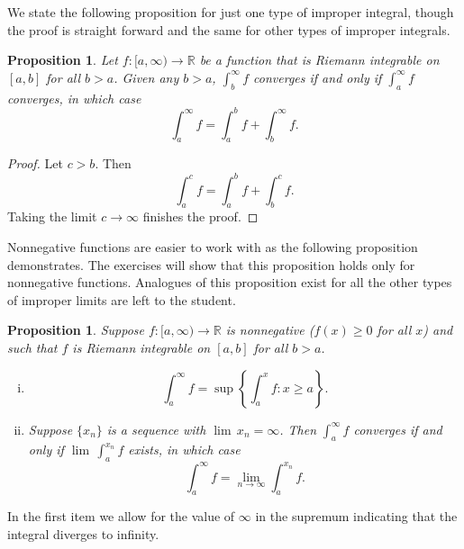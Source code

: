 \documentclass[12pt]{book}
\newcommand{\R}{{\mathbb{R}}}
\theoremstyle{plain}
\newtheorem{prop}[thm]{Proposition}
\theoremstyle{remark}
\theoremstyle{definition}
\theoremstyle{exercise}
\theoremstyle{example}
\begin{document}
We state the following proposition for just one type
of improper integral, though the proof is straight
forward and the same for other types of improper integrals.

\begin{prop} \label{impropriemann:tail}
Let $f \colon [a,\infty) \to \R$ be a function
that is Riemann integrable on $[a,b]$ for all $b > a$.
Given any $b > a$,
$\int_b^\infty f$ converges if and only if $\int_a^\infty f$
converges, in which case
\begin{equation*}
\int_a^\infty f
=
\int_a^b f +
\int_b^\infty f .
\end{equation*}
\end{prop}

\begin{proof}
Let $c > b$.  Then
\begin{equation*}
\int_a^c f
=
\int_a^b f +
\int_b^c f .
\end{equation*}
Taking the limit $c \to \infty$ finishes the proof.
\end{proof}

Nonnegative functions are easier to work with
as the following proposition demonstrates.
The exercises will show that this proposition
holds only for nonnegative functions.
Analogues of this proposition
exist for all the other types of improper limits are left to the
student.

\begin{prop} \label{impropriemann:possimp}
Suppose $f \colon [a,\infty) \to \R$ is nonnegative ($f(x)
\geq 0$ for all $x$) and such that
$f$ is Riemann integrable on $[a,b]$ for all $b > a$.
\begin{enumerate}[(i)]
\item 
\begin{equation*}
\int_a^\infty f = \sup \left\{ \int_a^x f : x \geq a \right\} .
\end{equation*}
\item
Suppose $\{ x_n \}$
is a sequence with $\lim\, x_n = \infty$.  Then
$\int_a^\infty f$ converges if and only if $\lim\, \int_a^{x_n} f$ exists, in
which case
\begin{equation*}
\int_a^\infty f = \lim_{n\to\infty} \int_a^{x_n} f .
\end{equation*}
\end{enumerate}
\end{prop}

In the first item we allow for the value of $\infty$ in the
supremum indicating that the integral diverges to infinity.
\end{document}
